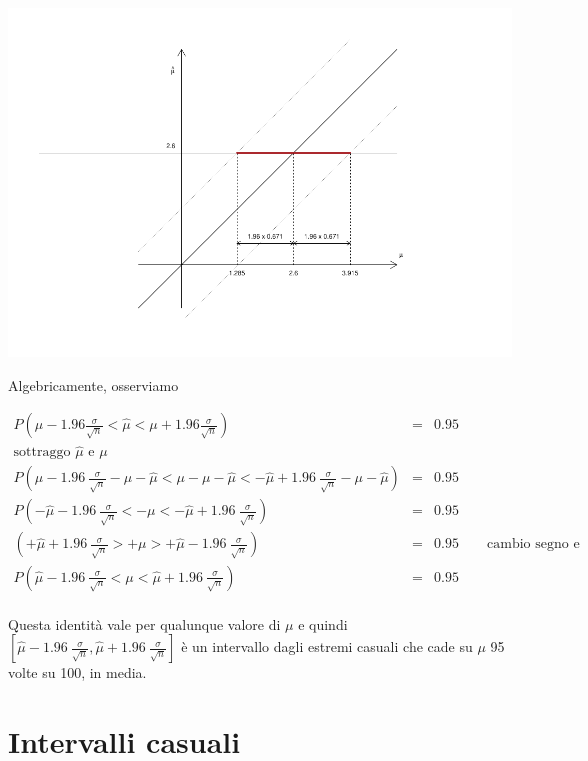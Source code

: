 \documentclass[
  11pt,
]{book}
\theoremstyle{mytheoremstyle}
\theoremstyle{mydefstyle}
\begin{document}
\begin{center}\includegraphics{Appunti_di_Statistica_2025_files/figure-latex/13-stima-intervallare-10-1} \end{center}

Algebricamente, osserviamo

\begin{eqnarray*}
  P\left(\mu - 1.96 \frac\sigma {\sqrt n}<\hat\mu<\mu + 1.96 \frac\sigma {\sqrt n}\right) &=& 0.95\\
  \text{sottraggo $\hat \mu$ e $\mu$}\\
  P\left(\mu - 1.96~\frac\sigma{\sqrt n}-\mu-\hat \mu< \mu-\mu-\hat \mu<-\hat \mu+1.96~\frac\sigma{\sqrt n}-\mu-\hat \mu\right) &=& 0.95 \\
  P\left(-\hat \mu- 1.96~\frac\sigma{\sqrt n}<-\mu<-\hat \mu+1.96~\frac\sigma{\sqrt n}\right) &=& 0.95\\
  \left(+\hat \mu+ 1.96~\frac\sigma{\sqrt n}>+\mu>+\hat \mu-1.96~\frac\sigma{\sqrt n}\right) &=& 0.95\qquad\text{cambio segno e verso}\\
  P\left(\hat \mu- 1.96~\frac\sigma{\sqrt n}<\mu<\hat \mu+1.96~\frac\sigma{\sqrt n}\right) &=& 0.95\\
\end{eqnarray*}

Questa identità vale per qualunque valore di \(\mu\) e quindi \(\left[\hat \mu- 1.96~\frac\sigma{\sqrt n},\hat \mu+ 1.96~\frac\sigma{\sqrt n}\right]\) è un intervallo dagli estremi casuali che cade su \(\mu\) 95 volte su 100, in media.

\section{Intervalli casuali}\label{intervalli-casuali}
\end{document}
